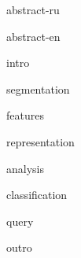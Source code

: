 
{abstract-ru}

{abstract-en}

\pagebreak

{intro}

{segmentation}

{features}

{representation}

{analysis}

{classification}

{query}

{outro}


